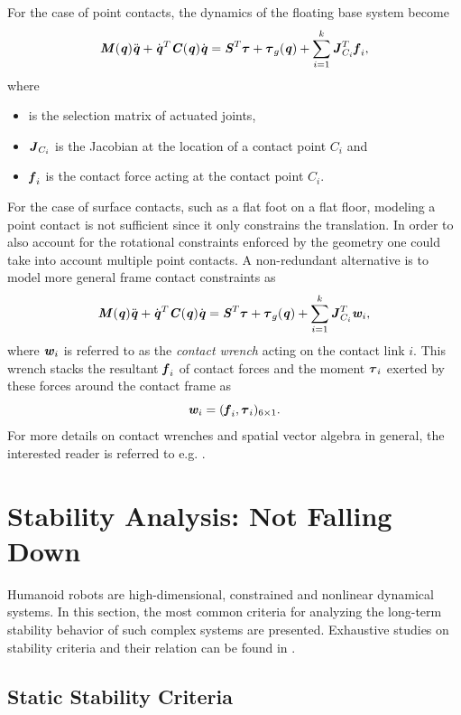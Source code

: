 For the case of point contacts, the dynamics of the floating base system become
\begin{equation*} \label{eqn:EoMLeggedRobotPtContact}
\bm{\mathit{M}}(\bm{\mathit{q}})\ddot{\bm{\mathit{q}}}+\dot{\bm{\mathit{q}}}^T\bm{\mathit{C}}(\bm{\mathit{q}})\dot{\bm{\mathit{q}}}=\bm{\mathit{S}}^T\bm{\mathit{\tau}}+\bm{\mathit{\tau}}_g(\bm{\mathit{q}})+\sum_{i=1}^{k}\bm{\mathit{J}}_{C_i}^T\bm{\mathit{f}}_i,
\end{equation*}
where 
\begin{itemize}
\item {} is the selection matrix of actuated joints,
\item $\bm{\mathit{J}}_{C_i}$ is the Jacobian at the location of a contact point $C_i$ and
\item $\bm{\mathit{f}}_i$ is the contact force acting at the contact point $C_i$.
\end{itemize}
For the case of surface contacts, such as a flat foot on a flat floor, modeling a point contact is not sufficient since it only constrains the translation. In order to also account for the rotational constraints enforced by the geometry one could take into account multiple point contacts. A non-redundant alternative is to model more general frame contact constraints as
\begin{equation} \label{eqn:EoMLeggedRobotSurfaceContact}
\bm{\mathit{M}}(\bm{\mathit{q}})\ddot{\bm{\mathit{q}}}+\dot{\bm{\mathit{q}}}^T\bm{\mathit{C}}(\bm{\mathit{q}})\dot{\bm{\mathit{q}}}=\bm{\mathit{S}}^T\bm{\mathit{\tau}}+\bm{\mathit{\tau}}_g(\bm{\mathit{q}})+\sum_{i=1}^{k}\bm{\mathit{J}}_{C_i}^T\bm{\mathit{w}}_i,
\end{equation}
where $\bm{\mathit{w}}_i$ is referred to as the \textit{contact wrench} acting on the contact link $i$. This wrench stacks the resultant $\bm{\mathit{f}}_i$ of contact forces and the moment $\bm{\mathit{\tau}}_i$ exerted by these forces around the contact frame as
$$\bm{\mathit{w}}_i=(\bm{\mathit{f}}_i,\bm{\mathit{\tau}}_i)_{6\times 1}.$$ 
For more details on contact wrenches and spatial vector algebra in general, the interested reader is referred to e.g. \cite[Ch.2]{featherstone2014rigid}.


\section{Stability Analysis: Not Falling Down}\label{sec:TheoryStability}
Humanoid robots are high-dimensional, constrained and nonlinear dynamical systems. In this section, the most common criteria  for analyzing the long-term stability behavior of such complex systems are presented. Exhaustive studies on stability criteria and their relation can be found in \cite{garcia2002classification, dekker2009zero, siciliano2016springer}.

\subsection{Static Stability Criteria}
